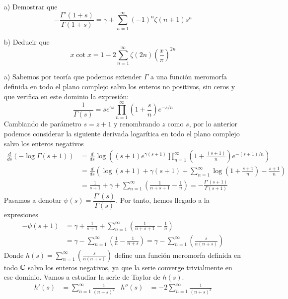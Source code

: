 \documentclass[twoside]{article}
\begin{document}
\begin{ejercicio}{4}
\begin{itemize}
\item[]
\item[a)] Demostrar que
$$
-\frac{\Gamma'(1+s)}{\Gamma(1+s)} = \gamma + \sum_{n=1}^\infty (-1)^n\zeta(n+1)s^n
$$
\item[b)] Deducir que
$$
x\cot x = 1 - 2\sum_{n=1}^\infty\zeta(2n)\left(\frac{x}{\pi}\right)^{2n}
$$
\end{itemize}
\end{ejercicio}
\begin{sol}
\begin{itemize}
\item[]
\item[a)] Sabemos por teoría que podemos extender $Γ$ a una función meromorfa definida en todo el plano complejo salvo los enteros no positivos, sin ceros y que verifica en este dominio la expresión:
\[ \frac{1}{Γ(s)} = s e^{γs} \prod_{n=1}^{∞} \left(1 + \frac{s}{n}\right) e^{-s/n} \]
Cambiando de parámetro $s=z+1$ y renombrando $z$ como $s$, por lo anterior podemos considerar la siguiente derivada logarítica en todo el plano complejo salvo los enteros negativos
\begin{align*}
\frac{d}{ds}\left(-\log \Gamma(s+1)\right) &=  \frac{d}{ds}\log\left((s+1) e^{γ(s+1)} \prod_{n=1}^{∞} \left(1 + \frac{(s+1)}{n}\right) e^{-(s+1)/n}\right)\\
&= \frac{d}{ds}\left( \log(s+1)+\gamma(s+1)+\sum_{n=1}^\infty \log\left(1+\frac{s+1}{n}\right)-\frac{s+1}{n}\right)\\
&= \frac{1}{s+1} +\gamma + \sum_{n=1}^\infty \left(\frac{1}{n+s+1}-\frac{1}{n}\right)= -\frac{\Gamma'(s+1)}{\Gamma(s+1)}
\end{align*}
Pasamos a denotar $\psi(s) = \dfrac{\Gamma'(s)}{\Gamma(s)}$. Por tanto, hemos llegado a la expresiones
\begin{align*}
-\psi(s+1) &= \gamma+\frac{1}{s+1} + \sum_{n=1}^\infty \left(\frac{1}{n+s+1}-\frac{1}{n}\right)\\
& = \gamma -\sum_{n=1}^\infty \left(\frac{1}{n} - \frac{1}{n+s}\right) = \gamma -\sum_{n=1}^\infty \left(\frac{s}{n(n+s)}\right) 
\end{align*}
Donde $h(s)=\sum_{n=1}^\infty \left(\frac{s}{n(n+s)}\right)$ define una función meromorfa definida en todo $\mathbb{C}$ salvo los enteros negativos, ya que la serie converge trivialmente en ese dominio. Vamos a estudiar la serie de Taylor de $h(s)$.
\begin{align*}
h'(s) & = \sum_{n=1}^\infty\frac{1}{(n+s)^2} & h''(s)&=  -2\sum_{n=1}^\infty\frac{1}{(n+s)^3}\\

\end{align*}
\end{itemize}
\end{sol}
\end{document}
